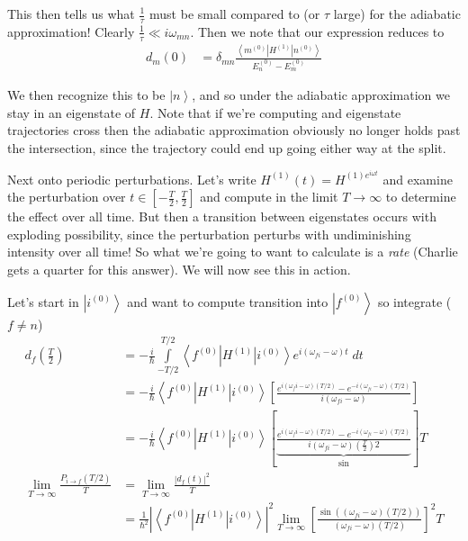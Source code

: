 \documentclass[10pt]{report}
\newcommand{\bra}[1]{\left<#1\right|}
\newcommand{\ket}[1]{\left|#1\right>}
\newcommand{\abs}[1]{\left|#1\right|}
\begin{document}
This then tells us what $\frac{1}{\tau}$ must be small compared to (or $\tau$ large) for the adiabatic approximation! Clearly $\frac{1}{\tau}\ll i\omega_{mn}$. Then we note that our expression reduces to
\begin{align}
    d_m(0) &= \delta_{mn}\frac{\bra{m^{(0)}}H^{(1)}\ket{n^{(0)}}}{E_n^{(0)} - E_m^{(0)}}
    \label{1.27.adiabaticfin}
\end{align}

We then recognize this to be $\ket{n}$, and so under the adiabatic approximation we stay in an eigenstate of $H$. Note that if we're computing and eigenstate trajectories cross then the adiabatic approximation obviously no longer holds past the intersection, since the trajectory could end up going either way at the split.

Next onto periodic perturbations. Let's write $H^{(1)}(t) = H^{(1)e^{i\omega t}}$ and examine the perturbation over $t \in \left[ -\frac{T}{2}, \frac{T}{2} \right]$ and compute in the limit $T \to \infty$ to determine the effect over all time. But then a transition between eigenstates occurs with exploding possibility, since the perturbation perturbs with undiminishing intensity over all time! So what we're going to want to calculate is a \emph{rate} (Charlie gets a quarter for this answer). We will now see this in action.

Let's start in $\ket{i^{(0)}}$ and want to compute transition into $\ket{f^{(0)}}$ so integrate ($f \neq n$)
\begin{align}
    d_f\left( \frac{T}{2} \right) &= -\frac{i}{\hbar}\displaystyle\int\limits_{-T/2}^{T/2}\bra{f^{(0)}}H^{(1)}\ket{i^{(0)}}e^{i\left( \omega_{fi} - \omega\right)t}\;dt\\
    &= -\frac{i}{\hbar}\bra{f^{(0)}}H^{(1)}\ket{i^{(0)}}\left[ \frac{e^{i(\omega_{f}i - \omega)(T/2)} - e^{-i(\omega_{fi}-\omega)(T/2)}}{i(\omega_{fi} - \omega)} \right]\\
    &= -\frac{i}{\hbar}\bra{f^{(0)}}H^{(1)}\ket{i^{(0)}}\left[ \underbrace{\frac{e^{i(\omega_{f}i - \omega)(T/2)} - e^{-i(\omega_{fi}-\omega)(T/2)}}{i(\omega_{fi} - \omega)\left( \frac{T}{2} \right)2}}_{\sin} \right]T\\
    \lim_{T \to \infty}\frac{P_{i\to f}(T/2)}{T} &= \lim_{T \to \infty} \frac{\abs{d_f(t)}^2}{T}\\
    &= \frac{1}{\hbar^2}\abs{\bra{f^{(0)}}H^{(1)}\ket{i^{(0)}}}^2\lim_{T \to \infty}\left[ \frac{\sin\left((\omega_{fi}-\omega)(T/2)\right)}{\left( \omega_{fi}-\omega \right)(T/2)} \right]^2T\\
    \label{1.27.periodAns}
\end{align}
\end{document}
